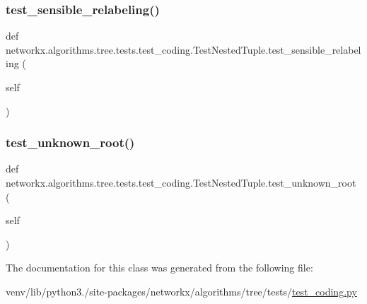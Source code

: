 \subsubsection{\texorpdfstring{test\+\_\+sensible\+\_\+relabeling()}{test\_sensible\_relabeling()}}
{\footnotesize\ttfamily def networkx.\+algorithms.\+tree.\+tests.\+test\+\_\+coding.\+Test\+Nested\+Tuple.\+test\+\_\+sensible\+\_\+relabeling (\begin{DoxyParamCaption}\item[{}]{self }\end{DoxyParamCaption})}

\mbox{\label{classnetworkx_1_1algorithms_1_1tree_1_1tests_1_1test__coding_1_1TestNestedTuple_a2cf26c8122f1cb05af8693d7008aa93e}} 
\subsubsection{\texorpdfstring{test\+\_\+unknown\+\_\+root()}{test\_unknown\_root()}}
{\footnotesize\ttfamily def networkx.\+algorithms.\+tree.\+tests.\+test\+\_\+coding.\+Test\+Nested\+Tuple.\+test\+\_\+unknown\+\_\+root (\begin{DoxyParamCaption}\item[{}]{self }\end{DoxyParamCaption})}



The documentation for this class was generated from the following file\+:\begin{DoxyCompactItemize}
\item 
venv/lib/python3./site-\/packages/networkx/algorithms/tree/tests/\hyperlink{test__coding_8py}{test\+\_\+coding.\+py}\end{DoxyCompactItemize}
